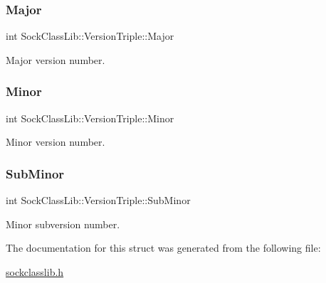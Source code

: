 \subsubsection{\texorpdfstring{Major}{Major}}
{\footnotesize\ttfamily int Sock\+Class\+Lib\+::\+Version\+Triple\+::\+Major}



Major version number. 

\mbox{\label{structSockClassLib_1_1VersionTriple_a4588deee7b7e148775da4407af465b8f}} 
\subsubsection{\texorpdfstring{Minor}{Minor}}
{\footnotesize\ttfamily int Sock\+Class\+Lib\+::\+Version\+Triple\+::\+Minor}



Minor version number. 

\mbox{\label{structSockClassLib_1_1VersionTriple_a5ca64bcae906bbd9a629c905548dd845}} 
\subsubsection{\texorpdfstring{Sub\+Minor}{SubMinor}}
{\footnotesize\ttfamily int Sock\+Class\+Lib\+::\+Version\+Triple\+::\+Sub\+Minor}



Minor subversion number. 



The documentation for this struct was generated from the following file\+:\begin{DoxyCompactItemize}
\item 
\hyperlink{sockclasslib_8h}{sockclasslib.\+h}\end{DoxyCompactItemize}
